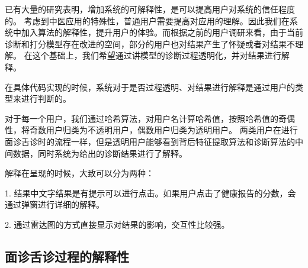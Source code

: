 已有大量的研究表明，增加系统的可解释性，是可以提高用户对系统的信任程度的。
考虑到中医应用的特殊性，普通用户需要提高对应用的理解。因此我们在系统中加入算法的解释性，提升用户的体验。而根据之前的用户调研来看，由于当前诊断和打分模型存在改进的空间，部分的用户也对结果产生了怀疑或者对结果不理解。
在这个基础上，我们希望通过讲模型的诊断过程透明化，并对结果进行解释。

在具体代码实现的时候，系统对于是否过程透明、对结果进行解释是通过用户的类型来进行判断的。

对于每一个用户，我们通过哈希算法，对用户名计算哈希值，按照哈希值的奇偶性，将奇数用户归类为不透明用户，偶数用户归类为透明用户。
两类用户在进行面诊舌诊时的流程一样，但是透明用户能够看到背后特征提取算法和诊断算法的中间数据，同时系统为给出的诊断结果进行了解释。


解释在呈现的时候，大致可以分为两种：

1. 结果中文字结果是有提示可以进行点击。如果用户点击了健康报告的分数，会通过弹窗进行详细的解释。

2. 通过雷达图的方式直接显示对结果的影响，交互性比较强。

\subsection{面诊舌诊过程的解释性}

